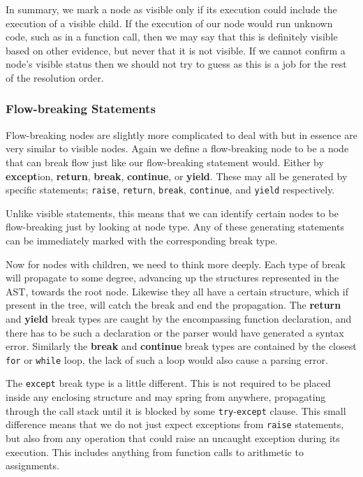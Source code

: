 \documentclass[twoside,a4paper]{report}
\begin{document}
In summary, we mark a node as visible only if its execution could include the execution of a visible child. If the execution of our node would run unknown
code, such as in a function call, then we may say that this is definitely visible based on other evidence, but never that it is not visible. If we cannot
confirm a node's visible status then we should not try to guess as this is a job for the rest of the resolution order.

\subsubsection{Flow-breaking Statements}

Flow-breaking nodes are slightly more complicated to deal with but in essence are very similar to visible nodes. Again we define a flow-breaking node
to be a node that can break flow just like our flow-breaking statement would. Either by \textbf{except}ion, \textbf{return}, \textbf{break}, \textbf{continue},
or \textbf{yield}. These may all be generated by specific statements; \texttt{raise}, \texttt{return}, \texttt{break}, \texttt{continue}, and \texttt{yield}
respectively.

Unlike visible statements, this means that we can identify certain nodes to be flow-breaking just by looking at node type. Any of these generating statements
can be immediately marked with the corresponding break type.

Now for nodes with children, we need to think more deeply. Each type of break will propagate to some degree, advancing up the structures represented in the
AST, towards the root node. Likewise they all have a certain structure, which if present in the tree, will catch the break and end the propagation. The
\textbf{return} and \textbf{yield} break types are caught by the encompassing function declaration, and there has to be such a declaration or the parser
would have generated a syntax error. Similarly the \textbf{break} and \textbf{continue} break types are contained by the closest \texttt{for} or
\texttt{while} loop, the lack of such a loop would also cause a parsing error.

The \texttt{except} break type is a little different. This is not required to be placed inside any enclosing structure and may spring from anywhere, propagating
through the call stack until it is blocked by some \texttt{try}-\texttt{except} clause. This small difference means that we do not just expect exceptions
from \texttt{raise} statements, but also from any operation that could raise an uncaught exception during its execution. This
includes anything from function calls to arithmetic to assignments.
\end{document}
